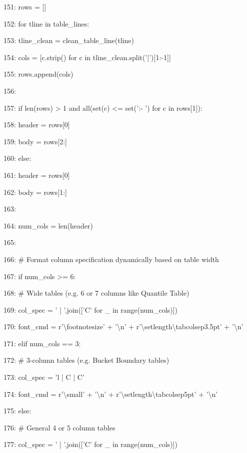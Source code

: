 \documentclass[11pt,a4paper]{article}
\begin{document}
151:                 rows = []

152:                 for tline in table\_lines:

153:                     tline\_clean = clean\_table\_line(tline)

154:                     cols = [c.strip() for c in tline\_clean.split('|')[1:-1]]

155:                     rows.append(cols)

156:

157:                 if len(rows) > 1 and all(set(c) <= set(':- ') for c in rows[1]):

158:                     header = rows[0]

159:                     body = rows[2:]

160:                 else:

161:                     header = rows[0]

162:                     body = rows[1:]

163:

164:                 num\_cols = len(header)

165:

166:                 \# Format column specification dynamically based on table width

167:                 if num\_cols >= 6:

168:                     \# Wide tables (e.g. 6 or 7 columns like Quantile Table)

169:                     col\_spec = ' | '.join(['C' for \_ in range(num\_cols)])

170:                     font\_cmd = r'\textbackslash{}footnotesize' + '\textbackslash{}n' + r'\textbackslash{}setlength{\textbackslash{}tabcolsep}{3.5pt}' + '\textbackslash{}n'

171:                 elif num\_cols == 3:

172:                     \# 3-column tables (e.g. Bucket Boundary tables)

173:                     col\_spec = 'l | C | C'

174:                     font\_cmd = r'\textbackslash{}small' + '\textbackslash{}n' + r'\textbackslash{}setlength{\textbackslash{}tabcolsep}{5pt}' + '\textbackslash{}n'

175:                 else:

176:                     \# General 4 or 5 column tables

177:                     col\_spec = ' | '.join(['C' for \_ in range(num\_cols)])
\end{document}
